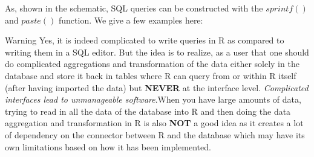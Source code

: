 \documentclass[12pt]{book}\usepackage{knitr}
\begin{document}
As, shown in the schematic, SQL queries can be constructed with the $sprintf()$ and $paste()$ function. We give a few examples here:
\begin{knitrout}
\color{fgcolor}
\end{knitrout}

\begin{DIY}{Warning}
Yes, it is indeed complicated to write queries in R as compared to writing them in a SQL editor. But the idea is to realize, as a user that one should do complicated aggregations and transformation of the data either solely in the database and store it back in tables where R can query from or within R itself (after having imported the data) but \textbf{NEVER} at the interface level. \emph{Complicated interfaces lead to unmanageable software}.When you have large amounts of data, trying to read in all the data of the database into R and then doing the data aggregation and transformation in R is also \textbf{NOT} a good idea as it creates a lot of dependency on the connector between R and the database which may have its own limitations based on how it has been implemented.  
\end{DIY}
\end{document}
